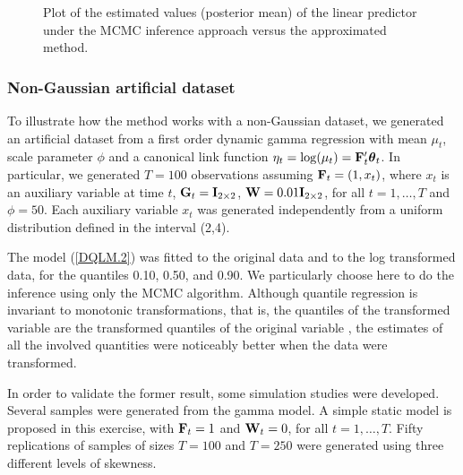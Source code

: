 \documentclass[12pt,a4paper]{article}\usepackage[]{graphicx}\usepackage[]{color}\usepackage{subfigure}
\newcommand{\bftheta}{\boldsymbol{\theta}}
\begin{document}
\begin{figure}[h!]
\begin{center}
\hspace{-0.3 cm} %
\hspace{-0.4 cm}
\end{center}
\vspace{-0.5 cm}\caption{Plot of the estimated values (posterior mean)  of the linear predictor under the MCMC inference approach versus the
approximated method.}\label{qqplot_seas_trend}
\end{figure}


\subsubsection{Non-Gaussian artificial dataset}\label{exp_fam}

To illustrate how the method works with a non-Gaussian dataset, we generated an artificial dataset from a first order dynamic gamma regression with mean $\mu_t$, scale parameter $\phi$ and a canonical link function $\eta_t = \log(\mu_t)={\bf F}_t'\bftheta_t$. 
In particular, we generated $T=100$ observations assuming ${\bf F}_t=(1,x_{t})$, where $x_t$ is an auxiliary variable at time $t$, 
${\bf G}_t= {\bf I}_{2\times2}$, ${\bf W}=0.01{\bf I}_{2\times2}$, for all $t=1,\dots,T$  and $\phi=50$. 
Each auxiliary variable $x_t$ was generated independently from a uniform distribution defined in the interval (2,4).

The model (\ref{DQLM.2}) was fitted to the original data and to the log transformed data, for the quantiles 0.10, 0.50, and 0.90. We particularly choose here to do the inference using only the MCMC algorithm. Although quantile regression is invariant to monotonic transformations, that is, the quantiles of the transformed variable are the transformed quantiles of the original variable \cite[chapter 2, p. 34]{Koenker2005}, the estimates of all the involved quantities were noticeably better when the data were transformed. 

 
In order to validate the former result, some simulation studies were developed. Several samples were  generated from the gamma model. 
A simple static model is proposed in this exercise,  with ${\bf F}_t=1$ and ${\bf W}_t=0$, for all $t=1,\dots,T$.  
Fifty replications of samples of  sizes $T=100$ and $T=250$ were generated using three  different levels of skewness.
\end{document}
